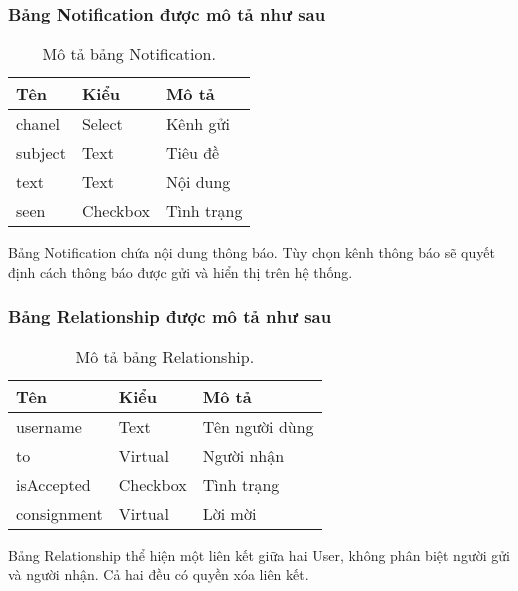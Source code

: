 \subsubsection{Bảng Notification được mô tả như sau}
\begin{table}[!htbp]\fontsize{13px}{13px}\selectfont\justifying
\begin{center}
\caption{Mô tả bảng Notification.}
\begin{tabularx}{0.6\textwidth}{ |l|l|X| } 
\hline
Tên & Kiểu & Mô tả \\
\hline
chanel & Select & Kênh gửi \\
subject & Text & Tiêu đề \\
text & Text & Nội dung \\
seen & Checkbox & Tình trạng \\ 
\hline
\end{tabularx}
\label{table:Notification}
\end{center}
Bảng Notification chứa nội dung thông báo. Tùy chọn kênh thông báo sẽ quyết định cách thông báo được gửi và hiển thị trên hệ thống.
\end{table}

\subsubsection{Bảng Relationship được mô tả như sau}
\begin{table}[!htbp]\fontsize{13px}{13px}\selectfont\justifying
\begin{center}
\caption{Mô tả bảng Relationship.}
\begin{tabularx}{0.6\textwidth}{ |l|l|X| } 
\hline
Tên & Kiểu & Mô tả \\
\hline
username & Text & Tên người dùng \\
to & Virtual & Người nhận \\
isAccepted & Checkbox & Tình trạng \\
consignment & Virtual & Lời mời \\ 
\hline
\end{tabularx}
\label{table:Relationship}
\end{center}
Bảng Relationship thể hiện một liên kết giữa hai User, không phân biệt người gửi và người nhận. Cả hai đều có quyền xóa liên kết.
\end{table}
\clearpage
